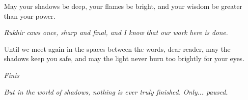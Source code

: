 \documentclass[12pt,twoside]{book}
\newcommand{\shadow}[1]{\textit{#1}}
\begin{document}
May your shadows be deep, your flames be bright, and your wisdom be greater than your power.

\shadow{Rukhir caws once, sharp and final, and I know that our work here is done.}

Until we meet again in the spaces between the words, dear reader, may the shadows keep you safe, and may the light never burn too brightly for your eyes.

\begin{center}
\textit{Finis}
\end{center}

\shadow{But in the world of shadows, nothing is ever truly finished. Only... paused.}
\end{document}
